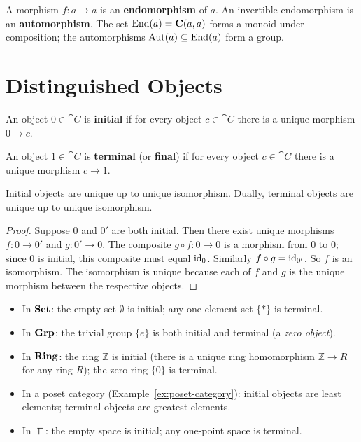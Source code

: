 \begin{definition}
A morphism $f: a \to a$ is an \textbf{endomorphism} of $a$. An invertible endomorphism is an \textbf{automorphism}. The set $\operatorname{End}(a) = \mathbf{C}(a,a)$ forms a monoid under composition; the automorphisms $\operatorname{Aut}(a) \subseteq \operatorname{End}(a)$ form a group.
\end{definition}

\section{Distinguished Objects}

\begin{definition}
An object $0 \in \cat{C}$ is \textbf{initial} if for every object $c \in \cat{C}$ there is a unique morphism $0 \to c$.

An object $1 \in \cat{C}$ is \textbf{terminal} (or \textbf{final}) if for every object $c \in \cat{C}$ there is a unique morphism $c \to 1$.
\end{definition}

\begin{proposition}
Initial objects are unique up to unique isomorphism. Dually, terminal objects are unique up to unique isomorphism.
\end{proposition}

\begin{proof}
Suppose $0$ and $0'$ are both initial. Then there exist unique morphisms $f: 0 \to 0'$ and $g: 0' \to 0$. The composite $g \circ f: 0 \to 0$ is a morphism from $0$ to $0$; since $0$ is initial, this composite must equal $\mathrm{id}_0$. Similarly $f \circ g = \mathrm{id}_{0'}$. So $f$ is an isomorphism. The isomorphism is unique because each of $f$ and $g$ is the unique morphism between the respective objects.
\end{proof}

\begin{example}
\leavevmode
\begin{itemize}
  \item In $\mathbf{Set}$: the empty set $\emptyset$ is initial; any one-element set $\{*\}$ is terminal.
  \item In $\mathbf{Grp}$: the trivial group $\{e\}$ is both initial and terminal (a \emph{zero object}).
  \item In $\mathbf{Ring}$: the ring $\mathbb{Z}$ is initial (there is a unique ring homomorphism $\mathbb{Z} \to R$ for any ring $R$); the zero ring $\{0\}$ is terminal.
  \item In a poset category (Example~\ref{ex:poset-category}): initial objects are least elements; terminal objects are greatest elements.
  \item In $\Top$: the empty space is initial; any one-point space is terminal.
\end{itemize}
\end{example}


